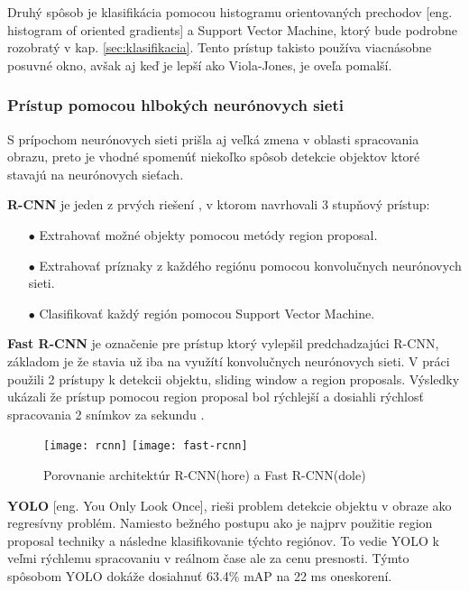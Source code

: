 Druhý spôsob je klasifikácia pomocou histogramu orientovaných prechodov [eng. histogram of oriented gradients] a Support Vector Machine, ktorý bude podrobne
    rozobratý v kap. \ref{sec:klasifikacia}. Tento prístup takisto používa viacnásobne posuvné okno, avšak aj keď je lepší ako Viola-Jones, je oveľa pomalší\cite{odkaz:ObjectDetectionOverview}.

\subsubsection{Prístup pomocou hlbokých neurónovych sieti}
S prípochom neurónovych sieti prišla aj veľká zmena v oblasti spracovania obrazu, preto je vhodné spomenúť niekoľko spôsob
    detekcie objektov ktoré stavajú na neurónovych sieťach.

\textbf{R-CNN} je jeden z prvých riešení \cite{prop:rcnn}, v ktorom navrhovali 3 stupňový prístup:
\begin{enumerate}
	\item[$\bullet$] Extrahovať možné objekty pomocou metódy region proposal.
    \item[$\bullet$] Extrahovať príznaky z každého regiónu pomocou konvolučnych neurónovych sieti.
    \item[$\bullet$] Clasifikovať každý región pomocou Support Vector Machine.
\end{enumerate}

\textbf{Fast R-CNN} je označenie pre prístup ktorý vylepšil predchadzajúci R-CNN, základom je že stavia už iba na využítí konvolučnych neurónovych sieti.
V práci použili 2 prístupy k detekcii objektu, sliding window a region proposals.
Výsledky ukázali že prístup pomocou region proposal bol rýchlejší a dosiahli rýchlosť spracovania 2 snímkov za sekundu \cite{prop:fast-rcnn}.
\begin{figure}[H]
    \centering
    \texttt{[image: rcnn]}
    \qquad
    \texttt{[image: fast-rcnn]}
    \caption{Porovnanie architektúr R-CNN(hore) a Fast R-CNN(dole)\cite{odkaz:ObjectDetectionOverview}}
    \label{pic:FastRCNN}
\end{figure}

\textbf{YOLO} [eng. You Only Look Once], rieši problem detekcie objektu v obraze ako regresívny problém.
Namiesto bežného postupu ako je najprv použitie region proposal techniky a následne klasifikovanie týchto regiónov.
To vedie YOLO k veľmi rýchlemu spracovaniu v reálnom čase ale za cenu presnosti.
Týmto spôsobom YOLO dokáže dosiahnuť 63.4\% mAP na 22 ms oneskorení\cite{prop:Redmon2016YouOL}.


